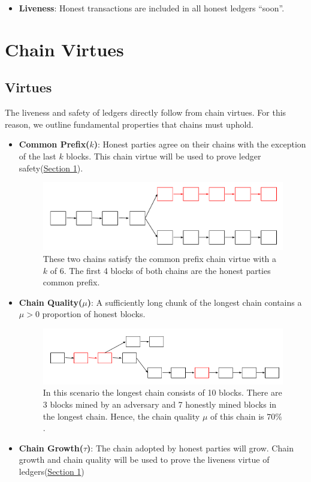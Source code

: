 \begin{itemize}
    \label{sec:liveness}
    \item \textbf{Liveness}: Honest transactions are included in all honest ledgers ``soon''.
\end{itemize}

\section{Chain Virtues}
\subsection{Virtues}
The liveness and safety of ledgers directly follow from chain virtues. For this reason, we outline fundamental properties that chains must uphold.
\begin{itemize}
    \item \textbf{Common Prefix($k$)}:
        Honest parties agree on their chains with the exception of the last $k$ blocks. This chain virtue will be used to prove ledger safety(\hyperref[sec:saftey]{Section 1}).
        \begin{figure}[h]
        \centering
        \includegraphics[width=\linewidth]{figures/commonprefix.pdf}
        \caption{These two chains satisfy the common prefix chain virtue with a $k$ of 6. The first 4 blocks of both chains are the honest parties common prefix.}
        \end{figure}
    \item \textbf{Chain Quality($\mu$)}: A sufficiently long chunk of the longest chain contains a $\mu > 0$ proportion of honest blocks.
    \begin{figure}[h]
    \centering
        \includegraphics[width=\linewidth]{figures/chainquality.png}
        \caption{In this scenario the longest chain consists of 10 blocks. There are 3 blocks mined by an adversary and 7 honestly mined blocks in the longest chain. Hence, the chain quality $\mu$ of this chain is $70\%$. }
    \end{figure}
    \item \textbf{Chain Growth($\tau$)}: The chain adopted by honest parties will grow. Chain growth and chain quality will be used to prove the liveness virtue of ledgers(\hyperref[sec:liveness]{Section 1})

\end{itemize}

